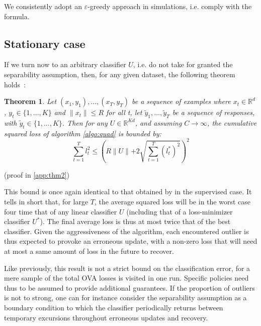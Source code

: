 \documentclass[preprint,12pt,authoryear]{elsarticle}
\newtheorem{theorem}{Theorem}
\begin{document}
\vspace{.5cm} 
We consistently adopt an $\varepsilon$-greedy approach in simulations, i.e. comply with the \cite{kakade2008efficient} formula.



\subsection{Stationary case}
If we turn now to an arbitrary classifier $U$, i.e. do not take for granted the separability assumption, then, for any given dataset, the following theorem holds~:

\begin{theorem}
	\label{theo:BPAT2}
	Let $(x_1,y_1),...,(x_T,y_T)$ be a sequence of examples where $x_t \in \mathbb{R}^d$, $y_t\in \{1,...,K\}$ and $\parallel x_t \parallel\leqslant R$ for all t, let $\tilde{y}_1,...,\tilde{y}_T$ be a sequence of responses, with $\tilde{y}_t\in \{1,...,K\}$. Then for any  $U \in \mathbb{R}^{K d}$, and assuming $C \rightarrow \infty$, the cumulative squared loss of algorithm \ref{algo:quad} is bounded by:
	\[\sum_{t=1}^{T}l_t^2 \leqslant \left(R\parallel{U}\parallel+2 \sqrt{\sum_{t=1}^{T}(l_t^{\ast})^2}\right)^2 \]
\end{theorem}

(proof in \ref{app:thm2})

This bound is once again identical to that obtained by 
\cite{crammer2006online} in the supervised case. 
It tells in short that, for large $T$, the average squared 
loss will be in the worst case four time that of any linear 
classifier $U$ (including that of a loss-minimizer classifier $U^*$). {\color{red} The  final average loss is thus at most twice that of the best classifier.} Given the aggressiveness of the algorithm, each encountered outlier is thus expected to provoke an erroneous update, with a non-zero loss that will need at most a same amount of loss in the future to recover.

Like previously, this result is not a strict bound on the classification error, for a mere sample of the total OVA losses is visited in one run. Specific policies need thus to be assumed to provide additional guarantees. If the proportion of outliers is not to strong, one can for instance consider the separability assumption as a boundary condition to which the classifier periodically returns between temporary excursions throughout erroneous updates and recovery. 
\end{document}
